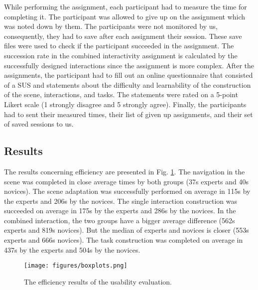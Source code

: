 \documentclass[conference]{IEEEtran}
\begin{document}
While performing the assignment, each participant had to measure the time for completing it. The participant was allowed to give up on the assignment which was noted down by them. The participants were not monitored by us, consequently, they had to save after each assignment their session. These save files were used to check if the participant succeeded in the assignment. The succession rate in the combined interactivity assignment is calculated by the successfully designed interactions since the assignment is more complex. After the assignments, the participant had to fill out an online questionnaire that consisted of a \ac{SUS}\cite{SUS} and statements about the difficulty and learnability of the construction of the scene, interactions, and tasks. The statements were rated on a 5-point Likert scale (1 strongly disagree and 5 strongly agree). Finally, the participants had to sent their measured times, their list of given up assignments, and their set of saved sessions to us.

\subsection{Results}
The results concerning efficiency are presented in Fig. \ref{efficiency}. The navigation in the scene was completed in close average times by both groups (37s experts and 40s novices). The scene adaptation was successfully performed on average in 115s by the experts and 206s by the novices. The single interaction construction was succeeded on average in 175s by the experts and 286s by the novices. In the combined interaction, the two groups have a bigger average difference (562s experts and 819s novices). But the median of experts and novices is closer (553s experts and 666s novices). The task construction was completed on average in 437s by the experts and 504s by the novices.

\begin{figure}[htbp]
\centerline{\texttt{[image: figures/boxplots.png]}}
\caption{The efficiency results of the usability evaluation.}
\label{efficiency}
\end{figure}
\end{document}
